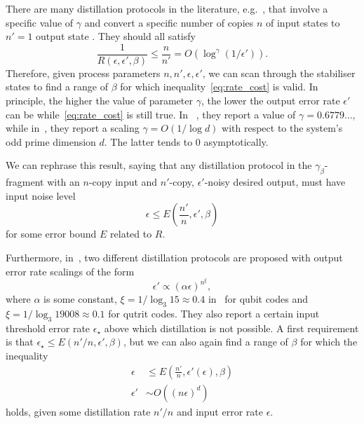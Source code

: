 \documentclass[pra,
aps,
twocolumn,
superscriptaddress,
groupedaddress,
nofootinbib,
reprint
]{revtex4-1}
\begin{document}
There are many distillation protocols in the literature, e.g.~\cite{Bravyi2012,Hastings2018}, that involve a specific value of $\gamma$ and convert a specific number of copies $n$ of input states to $n'=1$ output state .
They should all satisfy
\begin{equation}\label{eq:rate_cost}
	\frac{1}{R(\epsilon, \epsilon', \beta)} \leq \frac{n}{n'} = O(\log^\gamma{(1/\epsilon')}).
\end{equation}
Therefore, given process parameters $n, n', \epsilon, \epsilon'$, we can scan through the stabiliser states to find a range of $\beta$ for which inequality~\cref{eq:rate_cost} is valid.
In principle, the higher the value of parameter $\gamma$, the lower the output error rate $\epsilon'$ can be while~\cref{eq:rate_cost} is still true.
In~\cite{Hastings2018} , they report a value of $\gamma = 0.6779\dots$, while in~\cite{Krishna2019}, they report a scaling $\gamma = O(1/\log{d})$ with respect to the system's odd prime dimension $d$.
The latter tends to 0 asymptotically.

We can rephrase this result, saying that any distillation protocol in the $\gamma_\beta$-fragment with an $n$-copy input and $n'$-copy, $\epsilon'$-noisy desired output, must have input noise level 
\begin{equation}
	\epsilon \leq  E\left(\frac{n'}{n}, \epsilon', \beta \right)
\end{equation}
for some error bound $E$ related to $R$.

Furthermore, in~\cite{cit:bravyi,cit:prakash}, two different distillation protocols are proposed with output error rate scalings of the form 
\begin{equation}
	\epsilon' \propto (\alpha \epsilon)^{n^\xi},
\end{equation}
where $\alpha$ is some constant, $\xi = 1/\log_3{15} \approx 0.4$ in~\cite{cit:bravyi} for qubit codes and $\xi = 1/\log_3{19008} \approx 0.1$ for qutrit codes.
They also report a certain input threshold error rate $\epsilon_\star$ above which distillation is not possible.
A first requirement is that $\epsilon_\star \leq E(n'/n, \epsilon', \beta)$, but we can also again find a range of $\beta$ for which the inequality
\begin{align}
	\epsilon &\leq E\left(\frac{n'}{n}, \epsilon'(\epsilon), \beta \right) \\
	\epsilon' &\sim O\left((n\epsilon)^d\right)
\end{align}
holds, given some distillation rate $n'/n$ and input error rate $\epsilon$.
\end{document}

